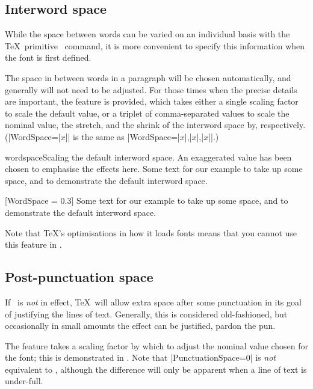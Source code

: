 \subsection{Interword space}

While the space between words can be varied on an individual
basis with the \TeX\ primitive \cmd\spaceskip\ command, it is
more convenient to specify this information when the font is
first defined.

The space in between words in a paragraph will be chosen automatically,
and generally will not need to be adjusted. For those
times when the precise details are important, the 
feature is
provided, which takes either a single scaling factor to scale the
default value, or a triplet of comma-separated
values to scale the nominal value, the stretch, and the shrink of the
interword space by, respectively. (|WordSpace={|$x$|}| is the same as
|WordSpace={|$x$|,|$x$|,|$x$|}|.)

\begingroup
\let\centering\relax
\begin{Xexample}{wordspace}{Scaling the default interword space. An exaggerated value has been chosen to emphasise the effects here.}
  Some text for our example to take
  up some space, and to demonstrate
  the default interword space.
  \bigskip

    [WordSpace = 0.3]
  Some text for our example to take
  up some space, and to demonstrate
  the default interword space.
\end{Xexample}
\endgroup

Note that \TeX's optimisations in how it loads fonts means that you cannot
use this feature in .

\subsection{Post-punctuation space}

If \cmd\frenchspacing\ is \emph{not} in effect, \TeX\ will allow extra
space after some punctuation in its goal of justifying the lines of text.
Generally, this is considered old-fashioned, but occasionally in small amounts the
effect can be justified, pardon the pun.

The  feature takes a scaling factor by which to
adjust the nominal value chosen for the font; this is demonstrated in
.
Note that |PunctuationSpace=0|
is \emph{not} equivalent to \cmd\frenchspacing, although the difference
will only be apparent when a line of text is under-full.


